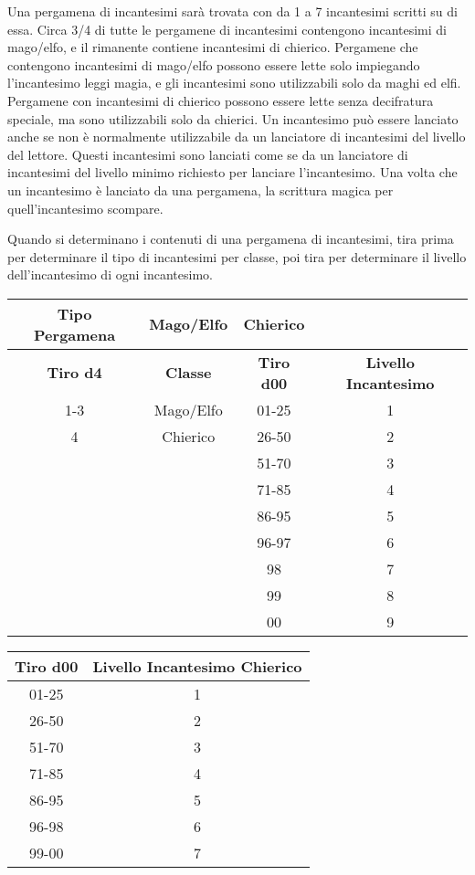 \documentclass{article}
\begin{document}
\begin{multicols}{2}
Una pergamena di incantesimi sarà trovata con da 1 a 7 incantesimi scritti su di essa. Circa 3/4 di tutte le pergamene di incantesimi contengono incantesimi di mago/elfo, e il rimanente contiene incantesimi di chierico. Pergamene che contengono incantesimi di mago/elfo possono essere lette solo impiegando l'incantesimo leggi magia, e gli incantesimi sono utilizzabili solo da maghi ed elfi. Pergamene con incantesimi di chierico possono essere lette senza decifratura speciale, ma sono utilizzabili solo da chierici. Un incantesimo può essere lanciato anche se non è normalmente utilizzabile da un lanciatore di incantesimi del livello del lettore. Questi incantesimi sono lanciati come se da un lanciatore di incantesimi del livello minimo richiesto per lanciare l'incantesimo. Una volta che un incantesimo è lanciato da una pergamena, la scrittura magica per quell'incantesimo scompare.

Quando si determinano i contenuti di una pergamena di incantesimi, tira prima per determinare il tipo di incantesimi per classe, poi tira per determinare il livello dell'incantesimo di ogni incantesimo.

\begin{table}[h]
\centering
\begin{tabular}{|c|c|c|c|}
\hline
\textbf{Tipo Pergamena} & \textbf{Mago/Elfo} & \textbf{Chierico} & \\
\hline
\textbf{Tiro d4} & \textbf{Classe} & \textbf{Tiro d00} & \textbf{Livello Incantesimo} \\
\hline
1-3 & Mago/Elfo & 01-25 & 1 \\
4 & Chierico & 26-50 & 2 \\
& & 51-70 & 3 \\
& & 71-85 & 4 \\
& & 86-95 & 5 \\
& & 96-97 & 6 \\
& & 98 & 7 \\
& & 99 & 8 \\
& & 00 & 9 \\
\hline
\end{tabular}

\end{table}

\begin{table}[h]
\centering
\begin{tabular}{|c|c|}
\hline
\textbf{Tiro d00} & \textbf{Livello Incantesimo Chierico} \\
\hline
01-25 & 1 \\
26-50 & 2 \\
51-70 & 3 \\
71-85 & 4 \\
86-95 & 5 \\
96-98 & 6 \\
99-00 & 7 \\
\hline
\end{tabular}


\end{table}
\end{multicols}
\end{document}
